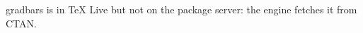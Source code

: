 \documentclass{article}
\begin{document}
gradbars is in TeX Live but not on the package server: the engine fetches it from CTAN.
\end{document}
